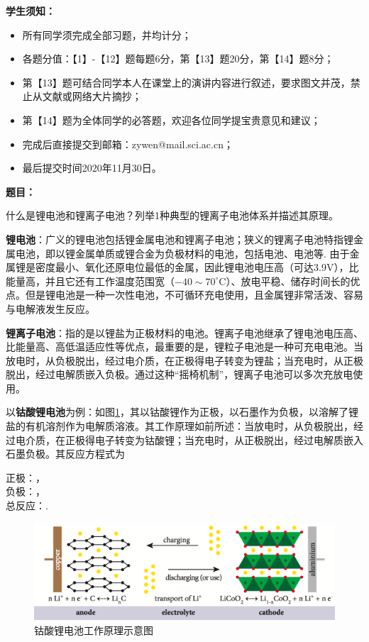 \documentclass{assignment}
\begin{document}
\noindent\textbf{学生须知：}
\begin{itemize}
    \item[1、] 所有同学须完成全部习题，并均计分；
    \item[2、] 各题分值：【1】-【12】题每题6分，第【13】题20分，第【14】题8分；
    \item[3、] 第【13】题可结合同学本人在课堂上的演讲内容进行叙述，要求图文并茂，禁止从文献或网络大片摘抄；
    \item[4、] 第【14】题为全体同学的必答题，欢迎各位同学提宝贵意见和建议；
    \item[5、] 完成后直接提交到邮箱：zywen@mail.sci.ac.cn；
    \item[6、] 最后提交时间2020年11月30日。
\end{itemize}

\noindent\textbf{题目：}
\begin{ti}
    什么是锂电池和锂离子电池？列举1种典型的锂离子电池体系并描述其原理。
\end{ti}
\begin{da}
    \textbf{锂电池}：广义的锂电池包括锂金属电池和锂离子电池；狭义的锂离子电池特指锂金属电池，即以锂金属单质或锂合金为负极材料的电池，包括电池、电池等. 由于金属锂是密度最小、氧化还原电位最低的金属，因此锂电池电压高（可达3.9V），比能量高，并且它还有工作温度范围宽（$-40\sim 70^{\circ}\mathrm{C}$）、放电平稳、储存时间长的优点。但是锂电池是一种一次性电池，不可循环充电使用，且金属锂非常活泼、容易与电解液发生反应。

    \textbf{锂离子电池}：指的是以锂盐为正极材料的电池。锂离子电池继承了锂电池电压高、比能量高、高低温适应性等优点，最重要的是，锂粒子电池是一种可充电电池。当放电时，从负极脱出，经过电介质，在正极得电子转变为锂盐；当充电时，从正极脱出，经过电解质嵌入负极。通过这种“摇椅机制”，锂离子电池可以多次充放电使用。

    以\textbf{钴酸锂电池}为例：如图\ref{LiCoO2-battery}，其以钴酸锂作为正极，以石墨作为负极，以溶解了锂盐的有机溶剂作为电解质溶液。其工作原理如前所述：当放电时，从负极脱出，经过电介质，在正极得电子转变为钴酸锂；当充电时，从正极脱出，经过电解质嵌入石墨负极。其反应方程式为
    \begin{center}
        正极：，\\
        负极：，\\
        总反应：.
    \end{center}
    \begin{figure}[H]
        \centering
        \includegraphics[width=.75\columnwidth]{LiCoO2-battery.png}
        \caption{钴酸锂电池工作原理示意图}
        \label{LiCoO2-battery}
    \end{figure}
\end{da}
\end{document}

